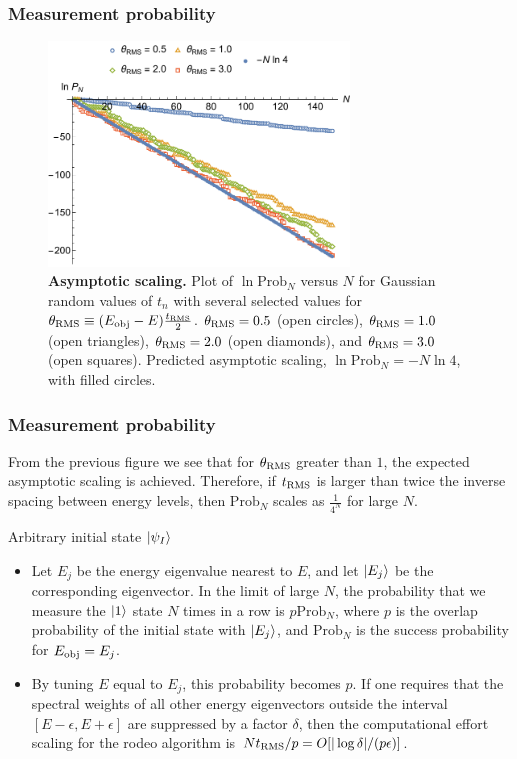\documentclass{beamer}
\begin{document}
\begin{frame}
\frametitle{Measurement probability}
\begin{figure}
\centering
\includegraphics[width=8.0cm]{rodeofigs/Asymptotic.pdf}
\caption{{\bf Asymptotic scaling.} Plot of $\ln \mathrm{Prob}_N$ versus $N$ for Gaussian random values of $t_n$ with several selected values for $\theta_{\rm RMS}\equiv(E_{\rm obj}-E)\tfrac{t_{\rm RMS}}{2}$.  $\theta_{\rm RMS}=0.5$ (open circles), $\theta_{\rm RMS}=1.0$ (open triangles), $\theta_{\rm RMS}=2.0$ (open diamonds), and $\theta_{\rm RMS}=3.0$ (open squares). Predicted asymptotic scaling, $\ln \mathrm{Prob}_N = -N \ln 4$, with filled circles.}
\label{asymptotic}
\end{figure} 
\end{frame}

\begin{frame}
\frametitle{Measurement probability}
From the previous figure we  see that for $\theta_{\rm RMS}$ greater than $1$, the expected asymptotic scaling is achieved.  Therefore, if $t_{\rm RMS}$ is larger than twice the inverse spacing between energy levels, then $\mathrm{Prob}_N$ scales as $\tfrac{1}{4^N}$ for large $N$.
\end{frame}



\begin{frame}{Arbitrary initial state $\ket{\psi_I}$}
\begin{itemize}
\item Let $E_j$ be the energy eigenvalue nearest to $E$, and let $\ket{E_j}$ be the corresponding eigenvector. In the limit of large $N$, the probability that we measure the $\ket{1}$ state $N$ times in a row is $p\mathrm{Prob}_N$, where $p$ is the overlap probability of the initial state with $\ket{E_j}$, and $\mathrm{Prob}_N$ is the success probability for $E_{\rm obj}=E_j$. 

\item By tuning $E$ equal to $E_j$, this probability becomes $p$. If one requires that the spectral weights of all other energy eigenvectors outside the interval $[E-\epsilon,  E+\epsilon]$ are suppressed by a factor $\delta$, then the computational effort scaling for the rodeo algorithm is $N t_{\rm RMS}/p = O[|\log \delta|/(p \epsilon)]$. 

\end{itemize}

\end{frame}
\end{document}
